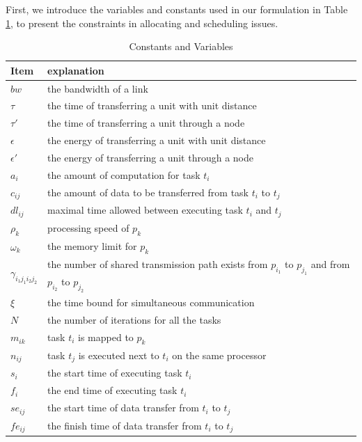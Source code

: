 First, we introduce the variables and constants used in our formulation in Table \ref{tab:var}, to present the constraints in allocating and scheduling issues.
\begin{table}[t]\caption{Constants and Variables \label{tab:var}}
\centering\small
\begin{tabular}{l l}\hline
Item & explanation\\\hline$bw$ & the bandwidth of a link \\
$\tau$& the time  of transferring a unit with unit distance\\
$\tau'$& the time  of transferring a unit through a node\\
$\epsilon$ & the energy of transferring a unit with unit distance\\
$\epsilon'$ & the energy of transferring a unit through a node\\
$a_i$ & the amount of computation for task $t_i$ \\
$c_{ij}$ & the amount of data to be transferred from task $t_i$ to $t_j$\\
$dl_{ij}$ & maximal time allowed between executing task $t_i$ and $t_j$\\
$\rho_k$ & processing speed of  $p_k$\\
$\omega_k$  & the memory limit for $p_k$ \\
$\gamma_{{i_1}{j_1}{i_2}{j_2}}$ & the number of shared transmission path exists from $p_{i_1}$ to $p_{j_1}$ and from $p_{i_2}$ to $p_{j_2}$\\
$\xi$ & the time bound for simultaneous communication \\
$N$ & the number of iterations for all the tasks\\\hline
$m_{ik}$ & task $t_i$ is mapped to  $p_k$ \\
$n_{ij}$ & task $t_j$ is executed next to $t_i$ on the same processor\\
$s_i$  & the start time of executing task $t_i$ \\
$f_i$& the end time of executing task $t_i$ \\
$se_{ij}$ & the start time of data transfer from $t_i$ to $t_j$\\
$fe_{ij}$ & the finish time of data transfer from $t_i$ to $t_j$\\

\end{tabular}
\end{table}
